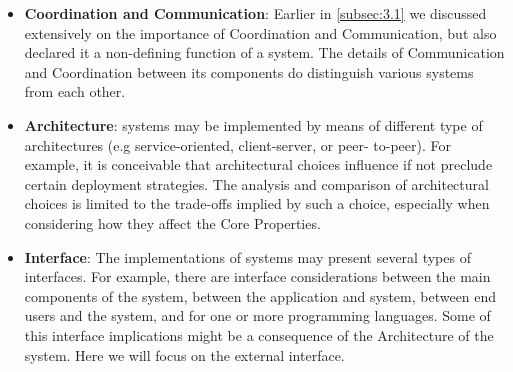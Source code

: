 \documentclass{sig-alternate}
\begin{document}
\begin{itemize}

\item \textbf{Coordination and Communication}: Earlier in \ref{subsec:3.1} we
  discussed extensively on the importance of Coordination and Communication,
  but also declared it a non-defining function of a \pilot system.
  The details of Communication and Coordination between its components do
  distinguish various \pilot systems from each other.

\item \textbf{Architecture}: \pilot systems may be implemented by
  means of different type of architectures (e.g service-oriented,
  client-server, or peer- to-peer). For example, it is conceivable
  that architectural choices influence if not preclude certain
  deployment strategies. The analysis and comparison of architectural
  choices is limited to the trade-offs implied by such a choice,
  especially when considering how they affect the Core Properties.




\item \textbf{Interface}: The implementations of \pilot systems may present
  several types of interfaces. For example, there are interface considerations
  between the main components of the \pilot system, between the application and
  \pilot system, between end users and the \pilot system, and for one or more
  programming languages. Some of this interface implications might be a
  consequence of the Architecture of the \pilot system.
  Here we will focus on the external interface.


\end{itemize}
\end{document}
